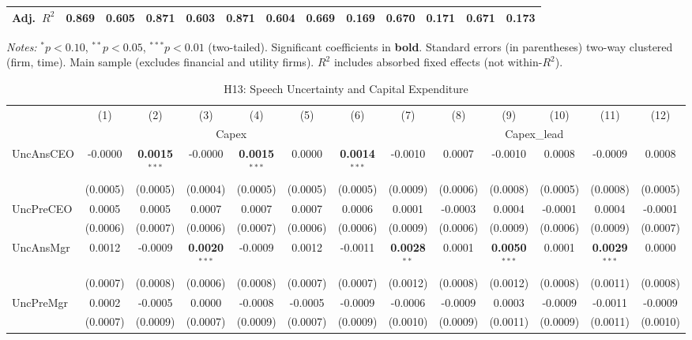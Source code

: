 \documentclass[11pt,a4paper]{article}
\begin{document}
\begin{table}[htbp]
\begin{tabular}{lcccccccccccc}
Adj.~$R^2$ & 0.869 & 0.605 & 0.871 & 0.603 & 0.871 & 0.604 & 0.669 & 0.169 & 0.670 & 0.171 & 0.671 & 0.173 \\
\bottomrule
\end{tabular}
\begin{minipage}{\linewidth}
\vspace{2pt}\scriptsize
\textit{Notes:} $^{*}p<0.10$, $^{**}p<0.05$, $^{***}p<0.01$ (two-tailed).
 Significant coefficients in \textbf{bold}.
 Standard errors (in parentheses) two-way clustered (firm, time).
 Main sample (excludes financial and utility firms).
 $R^2$ includes absorbed fixed effects (not within-$R^2$).
\end{minipage}
\end{table}
\clearpage
\begin{table}[htbp]
\centering
\caption{H13: Speech Uncertainty and Capital Expenditure}
\label{tab:h13}
\scriptsize
\begin{tabular}{lcccccccccccc}
\toprule
 & (1) & (2) & (3) & (4) & (5) & (6) & (7) & (8) & (9) & (10) & (11) & (12) \\
 & \multicolumn{6}{c}{Capex} & \multicolumn{6}{c}{Capex\_lead} \\
\cmidrule(lr){2-7} \cmidrule(lr){8-13}
\midrule
UncAnsCEO & -0.0000 & \textbf{0.0015}$^{***}$ & -0.0000 & \textbf{0.0015}$^{***}$ & 0.0000 & \textbf{0.0014}$^{***}$ & -0.0010 & 0.0007 & -0.0010 & 0.0008 & -0.0009 & 0.0008 \\
 & (0.0005) & (0.0005) & (0.0004) & (0.0005) & (0.0005) & (0.0005) & (0.0009) & (0.0006) & (0.0008) & (0.0005) & (0.0008) & (0.0005) \\
UncPreCEO & 0.0005 & 0.0005 & 0.0007 & 0.0007 & 0.0007 & 0.0006 & 0.0001 & -0.0003 & 0.0004 & -0.0001 & 0.0004 & -0.0001 \\
 & (0.0006) & (0.0007) & (0.0006) & (0.0007) & (0.0006) & (0.0006) & (0.0009) & (0.0006) & (0.0009) & (0.0006) & (0.0009) & (0.0007) \\
UncAnsMgr & 0.0012 & -0.0009 & \textbf{0.0020}$^{***}$ & -0.0009 & 0.0012 & -0.0011 & \textbf{0.0028}$^{**}$ & 0.0001 & \textbf{0.0050}$^{***}$ & 0.0001 & \textbf{0.0029}$^{***}$ & 0.0000 \\
 & (0.0007) & (0.0008) & (0.0006) & (0.0008) & (0.0007) & (0.0007) & (0.0012) & (0.0008) & (0.0012) & (0.0008) & (0.0011) & (0.0008) \\
UncPreMgr & 0.0002 & -0.0005 & 0.0000 & -0.0008 & -0.0005 & -0.0009 & -0.0006 & -0.0009 & 0.0003 & -0.0009 & -0.0011 & -0.0009 \\
 & (0.0007) & (0.0009) & (0.0007) & (0.0009) & (0.0007) & (0.0009) & (0.0010) & (0.0009) & (0.0011) & (0.0009) & (0.0011) & (0.0010) \\

\end{tabular}
\end{table}
\end{document}

